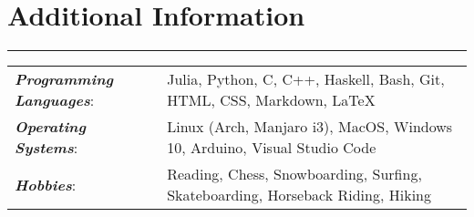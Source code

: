 \documentclass[9pt]{extarticle}
\newcommand{\myline}{\rule[\baselineskip]{\linewidth}{1pt}}
\begin{document}
\section{Additional Information}
\myline

\normalsize

\begin{tabular}{ll}
\textbf{\textit{Programming Languages}}: & Julia, Python, C, C++,  Haskell, Bash, Git, HTML, CSS, Markdown, \LaTeX \\
\textbf{\textit{Operating Systems}}: & Linux (Arch, Manjaro i3), MacOS, Windows 10, Arduino, Visual Studio Code \\ 
\textbf{\textit{Hobbies}}: & Reading, Chess, Snowboarding, Surfing, Skateboarding, Horseback Riding, Hiking \\    
\end{tabular}
\end{document}
